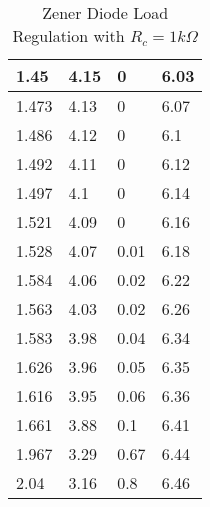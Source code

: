 \documentclass{scrartcl}
\newcommand{\1}{\mathbbm{1}}
\begin{document}
\begin{table}[!htb]
\begin{minipage}{.5\linewidth}
\begin{tabular}{|l|l|l|l|}
        1.45 & 4.15 & 0 & 6.03 \\ \hline
        1.473 & 4.13 & 0 & 6.07 \\ \hline
        1.486 & 4.12 & 0 & 6.1 \\ \hline
        1.492 & 4.11 & 0 & 6.12 \\ \hline
        1.497 & 4.1 & 0 & 6.14 \\ \hline
        1.521 & 4.09 & 0 & 6.16 \\ \hline
        1.528 & 4.07 & 0.01 & 6.18 \\ \hline
        1.584 & 4.06 & 0.02 & 6.22 \\ \hline
        1.563 & 4.03 & 0.02 & 6.26 \\ \hline
        1.583 & 3.98 & 0.04 & 6.34 \\ \hline
        1.626 & 3.96 & 0.05 & 6.35 \\ \hline
        1.616 & 3.95 & 0.06 & 6.36 \\ \hline
        1.661 & 3.88 & 0.1 & 6.41 \\ \hline
        1.967 & 3.29 & 0.67 & 6.44 \\ \hline
        2.04 & 3.16 & 0.8 & 6.46 \\ \hline
    \end{tabular}
    \caption{Zener Diode Load Regulation with $R_c = 1 k\Omega$}
	\label{tab:ZDload1ohm}
    \end{minipage} 
\end{table}
\end{document}
